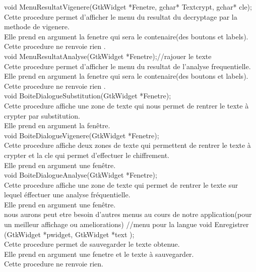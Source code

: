 \documentclass[a4]{article}
\begin{document}
	void MenuResultatVigenere(GtkWidget *Fenetre, gchar* Textcrypt, gchar* cle);\\
		Cette procedure permet d'afficher le menu du resultat du decryptage par la methode de vigenere.\\
		Elle prend en argument la fenetre qui sera le contenaire(des boutons et labels).\\
		Cette procedure ne renvoie rien .\\
	
	void MenuResultatAnalyse(GtkWidget *Fenetre);//rajouer le texte\\
		Cette procedure permet d'afficher le menu du resultat de l'analyse frequentielle.\\
		Elle prend en argument la fenetre qui sera le contenaire(des boutons et labels).\\
		Cette procedure ne renvoie rien .\\
	
		void BoiteDialogueSubstitution(GtkWidget *Fenetre);\\
		Cette procedure affiche une zone de texte qui nous permet de rentrer le texte à crypter par substitution.\\
		Elle prend en argument la fenêtre.\\
	
	void BoiteDialogueVigenere(GtkWidget *Fenetre);\\
		Cette procedure affiche deux zones de texte qui permettent de rentrer le texte à crypter et la cle qui permet d'effectuer le chiffrement.\\
		Elle prend en argument une fenêtre.\\
		
	void BoiteDialogueAnalyse(GtkWidget *Fenetre);\\
		Cette procedure affiche une zone de texte qui permet de rentrer le texte sur lequel éffectuer une analyse fréquentielle.\\
		Elle prend en argument une fenêtre.\\
	nous aurons peut etre besoin d'autres menus au cours de notre application(pour un meilleur affichage ou ameliorations) 
	//menu pour la langue
	void Enregistrer (GtkWidget *pwidget, GtkWidget *text );\\
		Cette procedure permet de sauvegarder le texte obtenue.\\
		Elle prend en argument une fenetre et le texte à sauvegarder.\\
		Cette procedure ne renvoie rien.\\
	
\end{document}
